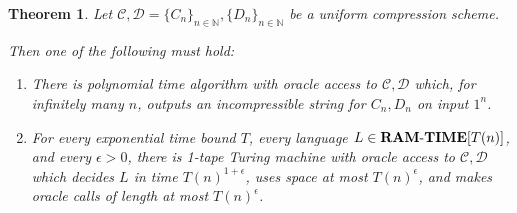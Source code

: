 \documentclass[11pt]{article}
\newtheorem{theorem}{Theorem}
\newcommand{\dash}{\text{-}}
\def\cl{\bf}
\begin{document}
\begin{theorem}\label{thm:low-space-sim}
Let $\mathcal{C},\mathcal{D} = \{C_n\}_{n \in \mathbb{N}}, \{D_n\}_{n \in \mathbb{N}}$ be a uniform compression scheme.

Then one of the following must hold:
\begin{enumerate}
    \item There is polynomial time algorithm with oracle access to $\mathcal{C},\mathcal{D}$ which, for infinitely many $n$, outputs an incompressible string for $C_n,D_n$ on input $1^n$.
    \item For every exponential time bound $T$, every language $L \in {\cl RAM\dash TIME}[T(n)]$, and every $\epsilon > 0$, there is 1-tape Turing machine with oracle access to $\mathcal{C},\mathcal{D}$ which decides $L$ in time $T(n)^{1+\epsilon}$, uses space at most $T(n)^{\epsilon}$, and makes oracle calls of length at most $T(n)^{\epsilon}$.
\end{enumerate}
\end{theorem}
\end{document}

